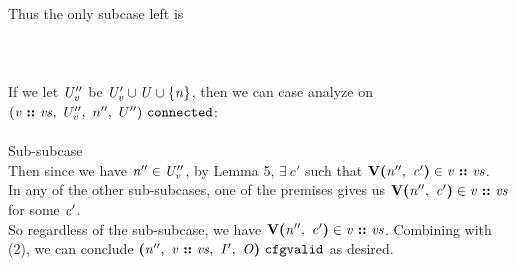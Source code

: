 \documentclass[12pt]{article}
\begin{document}
Thus the only subcase left is\\
\\
\\
\\

If we let $\mathit{U_v''}$ be $\mathit{U_v' \cup U \cup \{n\}}$, then we can
case analyze on $(\mathit{v}\ \textbf{::}\ \mathit{vs},\ U_v'',\ n'',\ U'')\ \mathtt{connected}$:\\
\\

Sub-subcase
\\

Then since we have $\mathit{n''} \in \mathit{U_v''}$, by Lemma 5, $\exists\ c'$
such that $\textbf{V(}\mathit{n''},\ \mathit{c'}\textbf{)} \in \mathit{v}\ \textbf{::}\ \mathit{vs}$.\\

In any of the other sub-subcases, one of the premises gives us
$\textbf{V(}\mathit{n''},\ \mathit{c'}\textbf{)} \in \mathit{v}\ \textbf{::}\ \mathit{vs}$ for some
$\mathit{c'}$.
\\

So regardless of the sub-subcase, we have $\textbf{V(}\mathit{n''},\ \mathit{c'}\textbf{)} \in
\mathit{v}\ \textbf{::}\ \mathit{vs}$. Combining with (2), we can conclude
$\textbf{(}\mathit{n''},\ \mathit{v}\ \textbf{::}\ \mathit{vs},\ \mathit{I'},\ \mathit{O}\textbf{)}\ \mathtt{cfgvalid}$
as desired.\\
\end{document}
